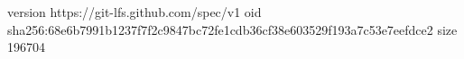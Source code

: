 version https://git-lfs.github.com/spec/v1
oid sha256:68e6b7991b1237f7f2c9847bc72fe1cdb36cf38e603529f193a7c53e7eefdce2
size 196704
